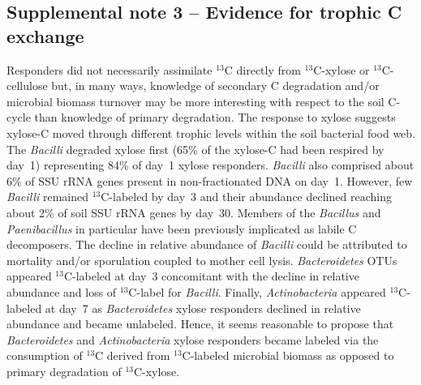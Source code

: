 \documentclass{article}
\begin{document}
\subsection{Supplemental note 3 -- Evidence for trophic C exchange}
Responders did not necessarily assimilate $^{13}$C directly
from $^{13}$C-xylose or $^{13}$C-cellulose but, in many ways, knowledge of
secondary C degradation and/or microbial biomass turnover may be more
interesting with respect to the soil C-cycle than knowledge of primary
degradation. The response to xylose suggests xylose-C moved through different
trophic levels within the soil bacterial food web. The \textit{Bacilli}
degraded xylose first (65\% of the xylose-C had been respired by day~1)
representing 84\% of day~1 xylose responders. \textit{Bacilli} also comprised
about 6\% of SSU rRNA genes present in non-fractionated DNA on day~1. However,
few \textit{Bacilli} remained $^{13}$C-labeled by day~3 and their abundance
declined reaching about 2\% of soil SSU rRNA genes by day~30. Members of the
\textit{Bacillus} \citep{Cleveland2007} and \textit{Paenibacillus} in
particular \citep{Verastegui_2014} have been previously implicated as labile
C decomposers. The decline in relative abundance of \textit{Bacilli} could be
attributed to mortality and/or sporulation coupled to mother cell lysis.
\textit{Bacteroidetes} OTUs appeared $^{13}$C-labeled at day~3 concomitant with
the decline in relative abundance and loss of $^{13}$C-label for
\textit{Bacilli}. Finally, \textit{Actinobacteria} appeared $^{13}$C-labeled at
day~7 as \textit{Bacteroidetes} xylose responders declined in relative
abundance and became unlabeled. Hence, it seems reasonable to propose that
\textit{Bacteroidetes} and \textit{Actinobacteria} xylose responders became
labeled via the consumption of $^{13}$C derived from $^{13}$C-labeled microbial
biomass as opposed to primary degradation of $^{13}$C-xylose. 
\end{document}
